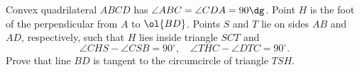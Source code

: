 Convex quadrilateral $ABCD$ has $\angle ABC = \angle CDA = 90\dg$.
Point $H$ is the foot of the perpendicular from $A$ to $\ol{BD}$.
Points $S$ and $T$ lie on sides $AB$ and $AD$,
respectively, such that $H$ lies inside triangle $SCT$ and
\[ \angle CHS - \angle CSB = 90^{\circ},
  \quad \angle THC - \angle DTC = 90^{\circ}. \]
Prove that line $BD$ is tangent to the circumcircle of triangle $TSH$.